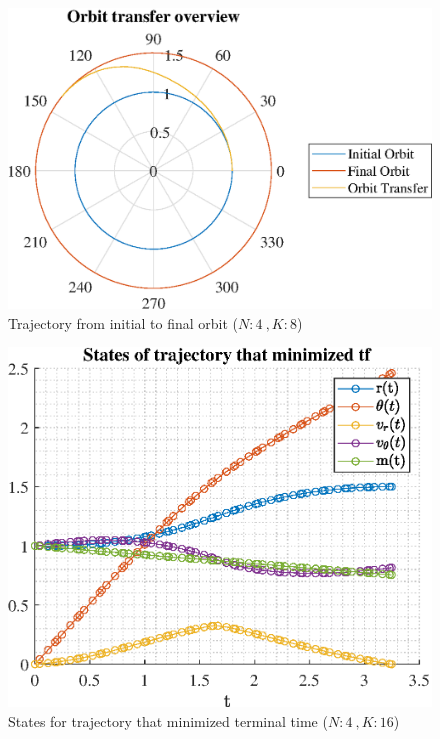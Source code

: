 \documentclass[]{article}
\begin{document}
	\begin{figure}
		\centering
		\includegraphics[scale=0.75]{orbit_N4_K8_C3_tf.eps}
		\caption{Trajectory from initial to final orbit (\(N:4\ , K:8\))}
		\label{fig:orbit_N4_K8_C3_tf}
	\end{figure}
	\begin{figure}
		\centering
		\includegraphics[scale=0.75]{states_N4_K16_C3_tf.eps}
		\caption{States for trajectory that minimized terminal time (\(N:4\ , K:16\))}
		\label{fig:states_N4_K16_C3_tf}
	\end{figure}
\end{document}
